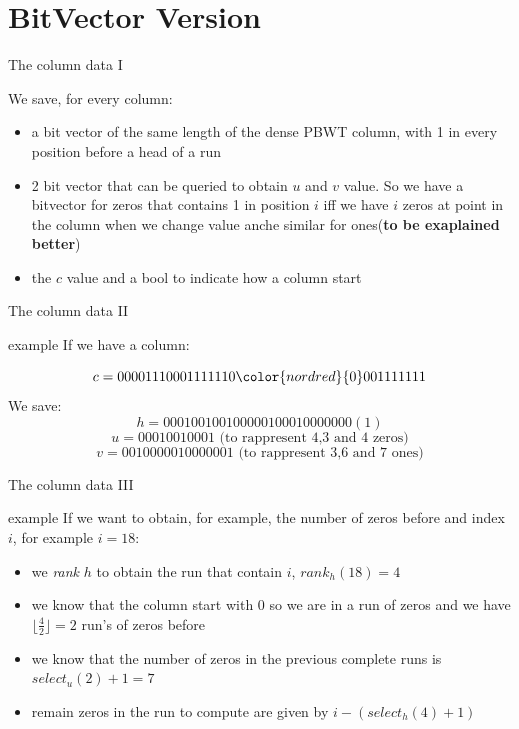 \documentclass{beamer}
\begin{document}
\section{BitVector Version}
\begin{frame}{The column data I}
  \begin{block}{}
    We save, for every column:
    \begin{itemize}
      \item a bit vector of the same length of the dense PBWT column, with 1 in
      every position before a head of a run
      \item 2 bit vector that can be queried to obtain $u$ and $v$ value. So we
      have a bitvector for zeros that contains 1 in position $i$ iff we have $i$
      zeros at point in the column when we change value anche similar for
      ones(\textbf{to be exaplained better})
      \item the $c$ value and a bool to indicate how a column start
    \end{itemize}
  \end{block}
\end{frame}
\begin{frame}{The column data II}
  \begin{block}{example}
    If we have a column:
    
    \[c=00001110001111110{\color{nordred}{0}}001111111\]
    We save:
    \[h=000100100100000100010000000(1)\]
    \[u=00010010001\mbox{ (to rappresent 4,3 and 4 zeros)}\]
    \[v=0010000010000001\mbox{ (to rappresent 3,6 and 7 ones)}\]
  \end{block}
\end{frame}
\begin{frame}{The column data III}
  \begin{block}{example}
    If we want to obtain, for example, the number of zeros before and index $i$,
    for example $i=18$:
    \begin{itemize}
      \item we \textit{rank} $h$ to obtain the run that contain $i$,
      $rank_h(18)= 4$ 
      \item we know that the column start with 0 so we are in a run of zeros and
      we have $\lfloor\frac{4}{2}\rfloor = 2$ run's of zeros before
      \item we know that the number of zeros in the previous complete runs is
      $select_u(2)+1 = 7$
      \item remain zeros in the run to compute are given by $i-(select_h(4)+1)$
    \end{itemize}
  \end{block}
\end{frame}
\end{document}
